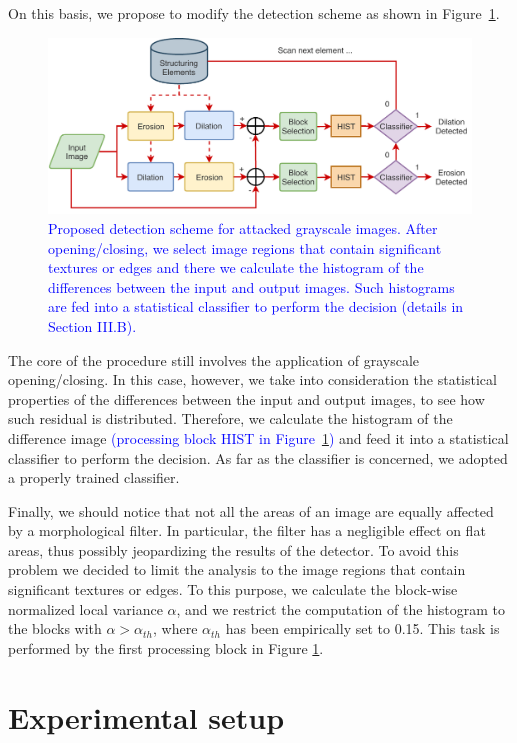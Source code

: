 \documentclass{ieeeaccess}
\begin{document}
On this basis, we propose to modify the detection scheme as shown in Figure~\ref{fig:scheme_improved}.
\begin{figure}[!ht]
	\centering
	\includegraphics[width=0.7\linewidth]{diagram2}
	\caption{\textcolor{blue}{Proposed detection scheme for attacked grayscale images. After opening/closing, we select image regions that contain significant textures or edges and there we calculate the histogram of the differences between the input and output images. Such histograms are fed into a statistical classifier to perform the decision (details in  Section III.B).}} 
	\label{fig:scheme_improved}
\end{figure}
The core of the procedure still involves the application of grayscale opening/closing. In this case, however, we take into consideration the statistical properties of the differences between the input and output images, to see how such residual is distributed. Therefore, we calculate the histogram of the difference image \textcolor{blue}{(processing block HIST in Figure~\ref{fig:scheme_improved})} and feed it into a statistical classifier to perform the decision. As far as the classifier is concerned, we adopted a properly trained classifier. %

Finally, we should notice that not all the areas of an image are equally affected by a morphological filter. In particular, the filter has a negligible effect on flat areas, thus possibly jeopardizing the results of the detector. To avoid this problem we decided to limit the analysis to the image regions that contain significant textures or edges. To this purpose, we calculate the block-wise normalized local variance $\alpha$, and we restrict the computation of the histogram to the blocks with $\alpha > \alpha_{th}$, where $\alpha_{th}$ has been empirically set to 0.15. This task is performed by the first processing block in Figure \ref{fig:scheme_improved}. 


\section{Experimental setup}
\label{sec:exp_setup}
\end{document}

